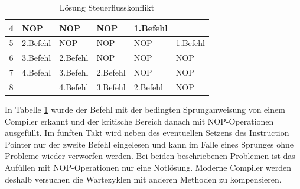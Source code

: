 \documentclass[12pt]{article}
\begin{document}
\begin{table}[!htb]
\begin{tabular}{|c|l|l|l|l|l|}
4                       & \cellcolor[HTML]{F8A102}NOP                                                             & \cellcolor[HTML]{F8A102}NOP                                                                & \cellcolor[HTML]{F8A102}NOP                                                                 & \cellcolor[HTML]{9698ED}1.Befehl        &                                                                                               \\ \hline
5                       & \cellcolor[HTML]{38FFF8}2.Befehl                                                        & \cellcolor[HTML]{F8A102}NOP                                                                & \cellcolor[HTML]{F8A102}NOP                                                                 & \cellcolor[HTML]{F8A102}NOP             & \cellcolor[HTML]{9698ED}1.Befehl                                                              \\ \hline
6                       & \cellcolor[HTML]{67FD9A}3.Befehl                                                        & \cellcolor[HTML]{38FFF8}2.Befehl                                                           & \cellcolor[HTML]{F8A102}NOP                                                                 & \cellcolor[HTML]{F8A102}NOP             & \cellcolor[HTML]{F8A102}NOP                                                                   \\ \hline
7                       & \cellcolor[HTML]{FFFE65}4.Befehl                                                        & \cellcolor[HTML]{67FD9A}3.Befehl                                                           & \cellcolor[HTML]{38FFF8}2.Befehl                                                            & \cellcolor[HTML]{F8A102}NOP             & \cellcolor[HTML]{F8A102}NOP                                                                   \\ \hline
\multicolumn{1}{|c|}{8} &                                                                                         & \cellcolor[HTML]{FFFE65}4.Befehl                                                           & \cellcolor[HTML]{67FD9A}3.Befehl                                                            & \cellcolor[HTML]{38FFF8}2.Befehl        & \cellcolor[HTML]{F8A102}NOP                                                                   \\ \hline
\end{tabular}
\caption{Lösung Steuerflusskonflikt}
\label{tab:loesungSteuerflusskonflikt}
\end{table}
\noindent In Tabelle
 \ref{tab:loesungSteuerflusskonflikt} wurde der Befehl mit der bedingten Sprunganweisung von einem Compiler erkannt und der kritische Bereich danach mit NOP-Operationen ausgefüllt. Im fünften Takt wird neben des eventuellen Setzens des Instruction Pointer nur der zweite Befehl eingelesen und kann im Falle eines Sprunges ohne Probleme wieder verworfen werden. Bei beiden beschriebenen Problemen ist das Aufüllen mit NOP-Operationen nur eine Notlösung. Moderne Compiler werden deshalb versuchen die Wartezyklen mit anderen Methoden zu kompensieren.
\end{document}
